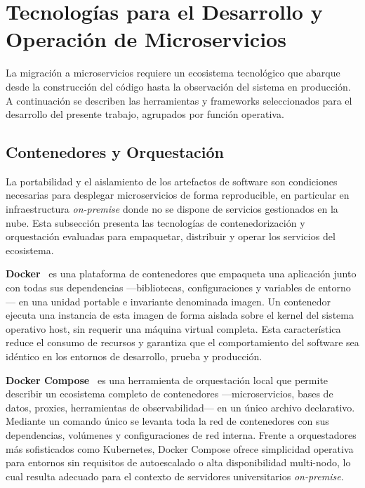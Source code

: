 \section{Tecnolog\'{i}as para el Desarrollo y Operaci\'{o}n de Microservicios}

La migraci\'{o}n a microservicios requiere un ecosistema tecnol\'{o}gico que abarque desde la construcci\'{o}n del c\'{o}digo hasta la observaci\'{o}n del sistema en producci\'{o}n. A continuaci\'{o}n se describen las herramientas y frameworks seleccionados para el desarrollo del presente trabajo, agrupados por funci\'{o}n operativa.

\subsection{Contenedores y Orquestaci\'{o}n}

La portabilidad y el aislamiento de los artefactos de software son condiciones necesarias para desplegar microservicios de forma reproducible, en particular en infraestructura \textit{on-premise} donde no se dispone de servicios gestionados en la nube. Esta subsecci\'{o}n presenta las tecnolog\'{i}as de contenedorizaci\'{o}n y orquestaci\'{o}n evaluadas para empaquetar, distribuir y operar los servicios del ecosistema.

\textbf{Docker}~\cite{docker2024} es una plataforma de contenedores que empaqueta una aplicaci\'{o}n junto con todas sus dependencias ---bibliotecas, configuraciones y variables de entorno--- en una unidad portable e invariante denominada imagen. Un contenedor ejecuta una instancia de esta imagen de forma aislada sobre el kernel del sistema operativo host, sin requerir una m\'{a}quina virtual completa. Esta caracter\'{i}stica reduce el consumo de recursos y garantiza que el comportamiento del software sea id\'{e}ntico en los entornos de desarrollo, prueba y producci\'{o}n.

\textbf{Docker Compose}~\cite{docker2024compose} es una herramienta de orquestaci\'{o}n local que permite describir un ecosistema completo de contenedores ---microservicios, bases de datos, proxies, herramientas de observabilidad--- en un \'{u}nico archivo declarativo. Mediante un comando \'{u}nico se levanta toda la red de contenedores con sus dependencias, vol\'{u}menes y configuraciones de red interna. Frente a orquestadores m\'{a}s sofisticados como Kubernetes, Docker Compose ofrece simplicidad operativa para entornos sin requisitos de autoescalado o alta disponibilidad multi-nodo, lo cual resulta adecuado para el contexto de servidores universitarios \textit{on-premise}.

